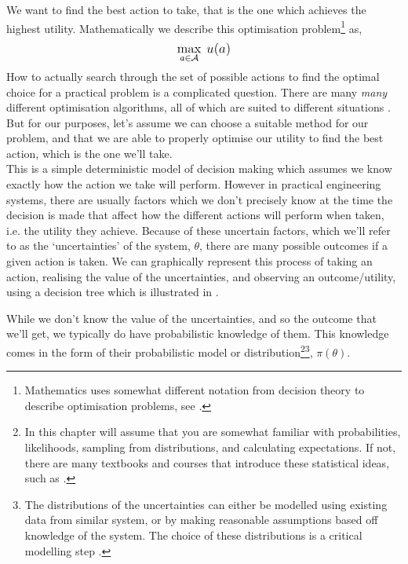 We want to find the best action to take, that is the one which achieves the highest utility. Mathematically we describe this optimisation problem\footnote{Mathematics uses somewhat different notation from decision theory to describe optimisation problems, see \citep{boyd2004ConvexOptimization}.} as,
\begin{equation}
    \mathlarger{\max_{a \in \mathcal{A}} \: u(a)}
\end{equation}
How to actually search through the set of possible actions to find the optimal choice for a practical problem is a complicated question. There are many \textit{many} different optimisation algorithms, all of which are suited to different situations \citep{bonnans2006NumericalOptimizationTheoretical}. But for our purposes, let's assume we can choose a suitable method for our problem, and that we are able to properly optimise our utility to find the best action, which is the one we'll take.\\

This is a simple deterministic model of decision making which assumes we know exactly how the action we take will perform. However in practical engineering systems, there are usually factors which we don't precisely know at the time the decision is made that affect how the different actions will perform when taken, i.e. the utility they achieve. Because of these uncertain factors, which we'll refer to as the `uncertainties' of the system, $\theta$, there are many possible outcomes if a given action is taken. We can graphically represent this process of taking an action, realising the value of the uncertainties, and observing an outcome/utility, using a decision tree which is illustrated in .



While we don't know the value of the uncertainties, and so the outcome that we'll get, we typically do have probabilistic knowledge of them. This knowledge comes in the form of their probabilistic model or distribution\footnote{In this chapter will assume that you are somewhat familiar with probabilities, likelihoods, sampling from distributions, and calculating expectations. If not, there are many textbooks and courses that introduce these statistical ideas, such as \citep{schwarzlander2011ProbabilityConceptsTheory}.}\fnsep\footnote{The distributions of the uncertainties can either be modelled using existing data from similar system, or by making reasonable assumptions based off knowledge of the system. The choice of these distributions is a critical modelling step \citep{vandeschoot2021BayesianStatisticsModelling}.}, $\pi(\theta)$.

